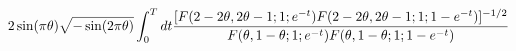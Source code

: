 \begin{equation} \label{double}
2 \sin (\pi \theta)
\sqrt{-\sin (2\pi \theta)}
\int_0^T dt
{[ F(2-2\theta , 2\theta-1; 1; e^{-t})
F(2-2\theta , 2\theta-1; 1; 1-e^{-t} ) ]^{-1/2}
\over
F(\theta , 1-\theta; 1; e^{-t})
F(\theta , 1-\theta; 1; 1-e^{-t} )}
\end{equation}

